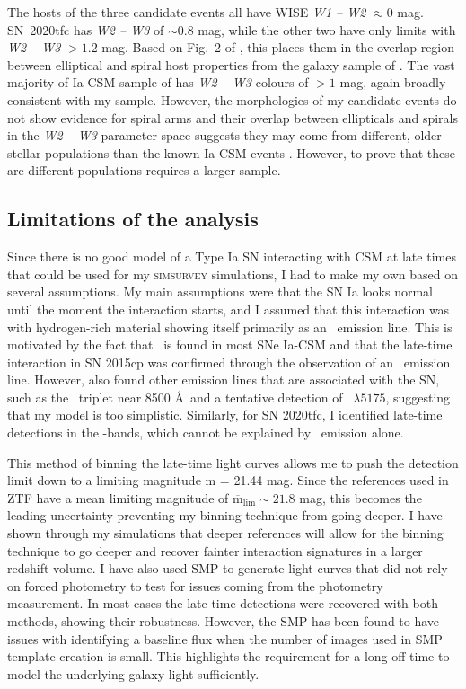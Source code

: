 \documentclass[a4paper,oneside,12pt, class=Latex/Classes/PhDthesisPSnPDF, crop=false]{standalone}
\begin{document}
The hosts of the three candidate events all have WISE \textit{W1 -- W2} $\approx0$ mag. SN~2020tfc has \textit{W2 -- W3} of $\sim0.8$ mag, while the other two have only limits with \textit{W2 -- W3} $> 1.2$ mag. Based on Fig.~2 of \cite{Irani_wise}, this places them in the overlap region between elliptical and spiral host properties from the galaxy sample of \cite{Lintott_galaxyzoo}. The vast majority of Ia-CSM sample of \cite{Ia-CSM_BTS} has \textit{W2 -- W3} colours of $> 1$ mag, again broadly consistent with my sample. However, the morphologies of my candidate events do not show evidence for spiral arms and their overlap between ellipticals and spirals in the \textit{W2 -- W3} parameter space suggests they may come from different, older stellar populations than the known Ia-CSM events \citep{Kool_He_CSM, Ia-CSM_BTS}. However, to prove that these are different populations requires a larger sample.


\subsection{Limitations of the analysis}
Since there is no good model of a Type Ia SN interacting with CSM at late times that could be used for my \textsc{simsurvey} simulations, I had to make my own based on several assumptions. My main assumptions were that the SN Ia looks normal until the moment the interaction starts, and I assumed that this interaction was with hydrogen-rich material showing itself primarily as an \Halpha~emission line. This is motivated by the fact that \Halpha\ is found in most SNe Ia-CSM and that the late-time interaction in SN 2015cp was confirmed through the observation of an \Halpha\ emission line. However, \citet{2015cp} also found other emission lines that are associated with the SN, such as the \CaII\ triplet near 8500 \AA~and a tentative detection of \MgI~$\lambda5175$, suggesting that my model is too simplistic. Similarly, for SN 2020tfc, I identified late-time detections in the \ztfg\ztfr\ztfi-bands, which cannot be explained by \Halpha\ emission alone.

This method of binning the late-time light curves allows me to push the detection limit down to a limiting magnitude m = 21.44 mag. Since the references used in ZTF have a mean limiting magnitude of $\overline{\text{m}}_\text{lim} \sim 21.8$ mag, this becomes the leading uncertainty preventing my binning technique from going deeper. I have shown through my simulations that deeper references will allow for the binning technique to go deeper and recover fainter interaction signatures in a larger redshift volume. I have also used SMP to generate light curves that did not rely on forced photometry to test for issues coming from the photometry measurement. In most cases the late-time detections were recovered with both methods, showing their robustness. However, the SMP has been found to have issues with identifying a baseline flux when the number of images used in SMP template creation is small. This highlights the requirement for a long off time to model the underlying galaxy light sufficiently.
\end{document}
